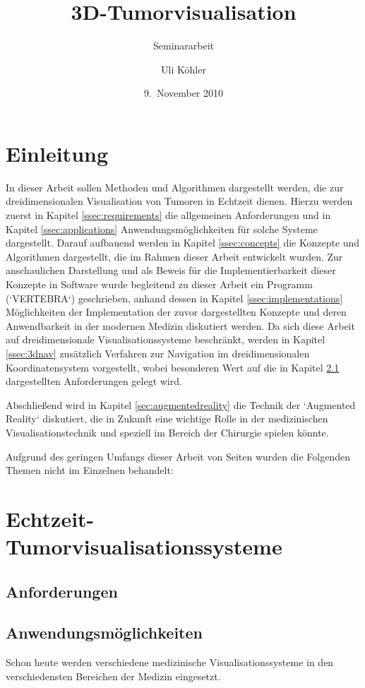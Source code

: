 \documentclass[a4paper]{scrartcl}
\title{3D-Tumorvisualisation}
\subtitle{Seminararbeit}
\author{Uli Köhler}
\date{9.~November 2010}
\begin{document}
\maketitle
\tableofcontents \newpage
\section{Einleitung}\label{sec:introduction}
In dieser Arbeit sollen Methoden und Algorithmen dargestellt werden, die zur dreidimensionalen Visualisation von Tumoren in Echtzeit dienen. Hierzu werden zuerst in Kapitel \vref{ssec:requirements} die allgemeinen Anforderungen und in Kapitel \vref{ssec:applications}
Anwendungsmöglichkeiten für solche Systeme dargestellt. Darauf aufbauend werden in Kapitel \vref{ssec:concepts} die Konzepte und Algorithmen dargestellt, die im Rahmen dieser Arbeit entwickelt wurden. Zur anschaulichen Darstellung und als Beweis für die Implementierbarkeit dieser Konzepte in Software wurde begleitend zu dieser Arbeit ein Programm (`VERTEBRA`) geschrieben, anhand dessen in Kapitel \vref{ssec:implementations} Möglichkeiten der Implementation der zuvor dargestellten Konzepte und deren Anwendbarkeit in der modernen Medizin diskutiert werden. Da sich diese Arbeit auf dreidimensionale Visualisationssysteme beschränkt, werden in Kapitel \vref{ssec:3dnav} zusätzlich Verfahren zur Navigation im dreidimensionalen Koordinatensystem vorgestellt, wobei besonderen Wert auf die in Kapitel \ref{ssec:requirements} dargestellten Anforderungen gelegt wird.

Abschließend wird in Kapitel \vref{sec:augmentedreality} die Technik der `Augmented Reality` diskutiert, die in Zukunft eine wichtige Rolle in der medizinischen Visualisationstechnik und speziell im Bereich der Chirurgie spielen könnte.

Aufgrund des geringen Umfangs dieser Arbeit von \pageref{appendixstart} Seiten wurden die Folgenden Themen nicht im Einzelnen behandelt:
\section{Echtzeit-Tumorvisualisationssysteme}\label{sec:vissystems}
\subsection{Anforderungen}\label{ssec:requirements}
\subsection{Anwendungsmöglichkeiten}\label{ssec:applications}
Schon heute werden verschiedene medizinische Visualisationssysteme in den verschiedensten Bereichen der Medizin eingesetzt. 
\end{document}
